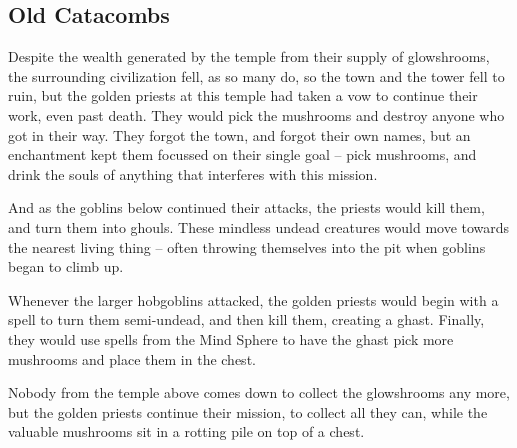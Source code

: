\begin{multicols}{2}

\needspace{10em}
\subsection{Old Catacombs}



\begin{exampletext}

  Despite the wealth generated by the temple from their supply of glowshrooms, the surrounding civilization fell, as so many do, so the town and the tower fell to ruin, but the golden priests at this temple had taken a vow to continue their work, even past death.
  They would pick the mushrooms and destroy anyone who got in their way.
  They forgot the town, and forgot their own names, but an enchantment kept them focussed on their single goal -- pick mushrooms, and drink the souls of anything that interferes with this mission.

  And as the goblins below continued their attacks, the priests would kill them, and turn them into ghouls.
  These mindless undead creatures would move towards the nearest living thing -- often throwing themselves into the pit when goblins began to climb up.

  Whenever the larger hobgoblins attacked, the golden priests would begin with a spell to turn them semi-undead, and then kill them, creating a ghast.%
  Finally, they would use spells from the Mind Sphere to have the ghast pick more mushrooms and place them in the chest.

  Nobody from the temple above comes down to collect the glowshrooms any more, but the golden priests continue their mission, to collect all they can, while the valuable mushrooms sit in a rotting pile on top of a chest.
\end{exampletext}


\end{multicols}

